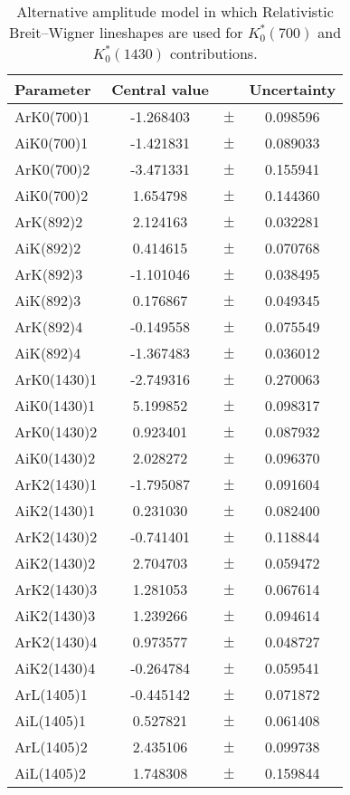 \clearpage

\begin{table}
\centering
\caption{Alternative amplitude model in which Relativistic Breit--Wigner lineshapes are used for $K^*_0(700)$ and $K^*_0(1430)$ contributions.}
\begin{tiny}
\begin{tabular}{lccc}
\toprule
Parameter & Central value & & Uncertainty\\
\midrule
ArK0(700)1 & -1.268403 & $\pm$ & 0.098596 \\
AiK0(700)1 & -1.421831 & $\pm$ & 0.089033 \\
ArK0(700)2 & -3.471331 & $\pm$ & 0.155941 \\
AiK0(700)2 & 1.654798 & $\pm$ & 0.144360 \\
ArK(892)2 & 2.124163 & $\pm$ & 0.032281 \\
AiK(892)2 & 0.414615 & $\pm$ & 0.070768 \\
ArK(892)3 & -1.101046 & $\pm$ & 0.038495 \\
AiK(892)3 & 0.176867 & $\pm$ & 0.049345 \\
ArK(892)4 & -0.149558 & $\pm$ & 0.075549 \\
AiK(892)4 & -1.367483 & $\pm$ & 0.036012 \\
ArK0(1430)1 & -2.749316 & $\pm$ & 0.270063 \\
AiK0(1430)1 & 5.199852 & $\pm$ & 0.098317 \\
ArK0(1430)2 & 0.923401 & $\pm$ & 0.087932 \\
AiK0(1430)2 & 2.028272 & $\pm$ & 0.096370 \\
ArK2(1430)1 & -1.795087 & $\pm$ & 0.091604 \\
AiK2(1430)1 & 0.231030 & $\pm$ & 0.082400 \\
ArK2(1430)2 & -0.741401 & $\pm$ & 0.118844 \\
AiK2(1430)2 & 2.704703 & $\pm$ & 0.059472 \\
ArK2(1430)3 & 1.281053 & $\pm$ & 0.067614 \\
AiK2(1430)3 & 1.239266 & $\pm$ & 0.094614 \\
ArK2(1430)4 & 0.973577 & $\pm$ & 0.048727 \\
AiK2(1430)4 & -0.264784 & $\pm$ & 0.059541 \\
ArL(1405)1 & -0.445142 & $\pm$ & 0.071872 \\
AiL(1405)1 & 0.527821 & $\pm$ & 0.061408 \\
ArL(1405)2 & 2.435106 & $\pm$ & 0.099738 \\
AiL(1405)2 & 1.748308 & $\pm$ & 0.159844 \\

\end{tabular}
\end{tiny}
\end{table}
